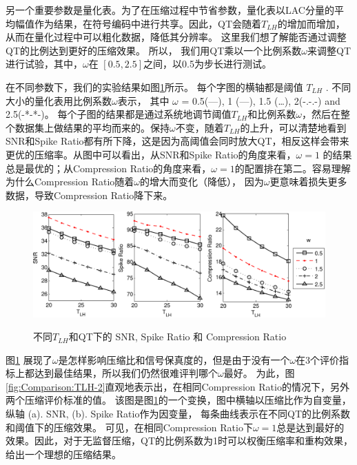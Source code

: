 另一个重要参数是量化表。为了在压缩过程中节省参数，量化表以LAC分量的平均幅值作为结果，在符号编码中进行共享。因此，QT会随着$T_{LH}$的增加而增加，从而在量化过程中可以粗化数据，降低其分辨率。 这里我们想了解能否通过调整QT的比例达到更好的压缩效果。 所以， 我们用QT乘以一个比例系数$\omega$来调整QT进行试验，其中，$\omega$在 $[0.5,2.5]$之间，以0.5为步长进行测试。


在不同参数下，我们的实验结果如图\ref{fig:Comparison-TLH}所示。 每个字图的横轴都是阈值 $T_{LH}$ . 不同大小的量化表用比例系数$\omega$表示， 其中 $\omega$ = 0.5(—), 1 (---), 1.5 (…), 2(-.-.-) and 2.5(-*-*-)。 每个子图的结果都是通过系统地调节阈值$T_{LH}$和比例系数$\omega$，然后在整个数据集上做结果的平均而来的。保持$\omega$不变，随着$T_{LH}$的上升，可以清楚地看到SNR和Spike Ratio都有所下降，这是因为高阈值会同时放大QT，相反这样会带来更优的压缩率。从图中可以看出，从SNR和Spike Ratio的角度来看，$\omega=1$ 的结果总是最优的；从Compression Ratio的角度来看，$\omega=1$的配置排在第二。容易理解为什么Compression Ratio随着$\omega$的增大而变化（降低）， 因为$\omega$更意味着损失更多数据，导致Compression Ratio降下来。


\begin{figure}[htb]
  \centering
  \includegraphics[scale=0.9]{Pictures/Compression/f10-crop.pdf}\\
  \caption{ 不同$T_{LH}$和QT下的 SNR, Spike Ratio 和 Compression Ratio}\label{fig:Comparison-TLH}
\end{figure}


图\ref{fig:Comparison-TLH} 展现了$\omega$是怎样影响压缩比和信号保真度的，但是由于没有一个$\omega$在3个评价指标上都达到最佳结果，所以我们仍然很难评判哪个$\omega$最好。 为此，图\ref{fig:Comparison:TLH-2}直观地表示出，在相同Compression Ratio的情况下，另外两个压缩评价标准的值。 该图是图\ref{fig:Comparison-TLH}的一个变换，图中横轴以压缩比作为自变量， 纵轴 (a). SNR, (b). Spike Ratio作为因变量， 每条曲线表示在不同QT的比例系数和阈值下的压缩效果。 可见，在相同Compression Ratio下$\omega=1$总是达到最好的效果。因此，对于无监督压缩，QT的比例系数为1时可以权衡压缩率和重构效果，给出一个理想的压缩结果。


